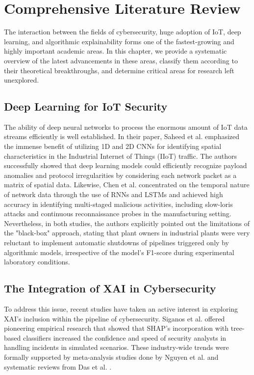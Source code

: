 \documentclass[12pt]{article}
\begin{document}
    \section{Comprehensive Literature Review}
    The interaction between the fields of cybersecurity, huge adoption of IoT, deep learning, and algorithmic explainability forms one of the fastest-growing and highly important academic areas. In this chapter, we provide a systematic overview of the latest advancements in these areas, classify them according to their theoretical breakthroughs, and determine critical areas for research left unexplored.

    \subsection{Deep Learning for IoT Security}
    The ability of deep neural networks to process the enormous amount of IoT data streams efficiently is well established. In their paper, Saheed et al. \cite{saheed2022explainable} emphasized the immense benefit of utilizing 1D and 2D CNNs for identifying spatial characteristics in the Industrial Internet of Things (IIoT) traffic. The authors successfully showed that deep learning models could efficiently recognize payload anomalies and protocol irregularities by considering each network packet as a matrix of spatial data. Likewise, Chen et al. \cite{chen2022explainable} concentrated on the temporal nature of network data through the use of RNNs and LSTMs and achieved high accuracy in identifying multi-staged malicious activities, including slow-loris attacks and continuous reconnaissance probes in the manufacturing setting. Nevertheless, in both studies, the authors explicitly pointed out the limitations of the "black-box" approach, stating that plant owners in industrial plants were very reluctant to implement automatic shutdowns of pipelines triggered only by algorithmic models, irrespective of the model's F1-score during experimental laboratory conditions.

    \subsection{The Integration of XAI in Cybersecurity}
    To address this issue, recent studies have taken an active interest in exploring XAI’s inclusion within the pipeline of cybersecurity. Siganos et al. \cite{siganos2023explainable} offered pioneering empirical research that showed that SHAP’s incorporation with tree-based classifiers increased the confidence and speed of security analysts in handling incidents in simulated scenarios. These industry-wide trends were formally supported by meta-analysis studies done by Nguyen et al. \cite{nguyen2022explainable} and systematic reviews from Das et al. \cite{das2023trustworthy}.
\end{document}
